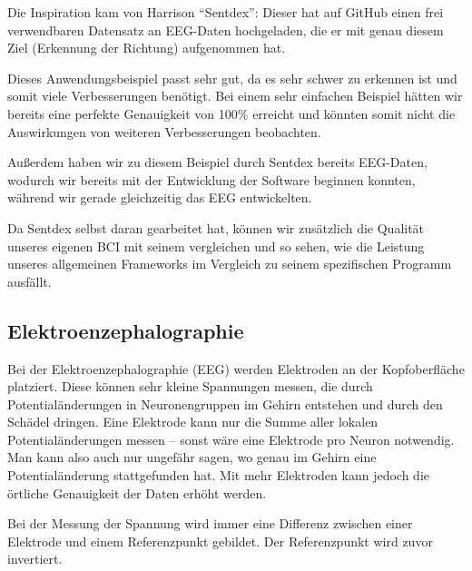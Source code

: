 \documentclass[10pt]{article}
\begin{document}
Die Inspiration kam von Harrison \enquote{Sentdex}: Dieser hat auf GitHub einen frei verwendbaren Datensatz an EEG-Daten hochgeladen, die er mit genau diesem Ziel (Erkennung der Richtung) aufgenommen hat. \cite{Sentdex}

Dieses Anwendungsbeispiel passt sehr gut, da es sehr schwer zu erkennen ist und somit viele Verbesserungen benötigt.
Bei einem sehr einfachen Beispiel hätten wir bereits eine perfekte Genauigkeit von 100\% erreicht und könnten somit nicht die Auswirkungen von weiteren Verbesserungen beobachten.

Außerdem haben wir zu diesem Beispiel durch Sentdex bereits EEG-Daten, wodurch wir bereits mit der Entwicklung der Software beginnen konnten, während wir gerade gleichzeitig das EEG entwickelten.

Da Sentdex selbst daran gearbeitet hat, können wir zusätzlich die Qualität unseres eigenen BCI mit seinem vergleichen und so sehen, wie die Leistung unseres allgemeinen Frameworks im Vergleich zu seinem spezifischen Programm ausfällt. 



\subsection{Elektroenzephalographie}

Bei der Elektroenzephalographie (EEG) werden Elektroden an der Kopfoberfläche platziert. 
Diese können sehr kleine Spannungen messen, die durch Potentialänderungen in Neuronengruppen im Gehirn entstehen und durch den Schädel dringen. 
Eine Elektrode kann nur die Summe aller lokalen Potentialänderungen messen -- sonst wäre eine Elektrode pro Neuron notwendig. 
Man kann also auch nur ungefähr sagen, wo genau im Gehirn eine Potentialänderung stattgefunden hat. 
Mit mehr Elektroden kann jedoch die örtliche Genauigkeit der Daten erhöht werden.

Bei der Messung der Spannung wird immer eine Differenz zwischen einer Elektrode und einem Referenzpunkt gebildet.
Der Referenzpunkt wird zuvor invertiert.
\end{document}
